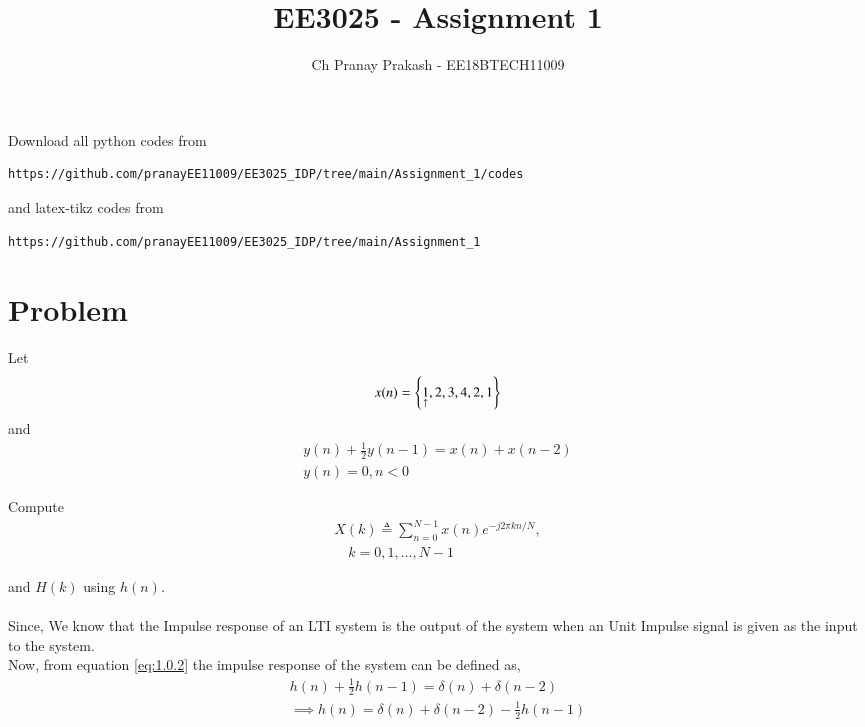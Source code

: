 \documentclass[journal,12pt,twocolumn]{IEEEtran}
\begin{document}
     \def\rightbox#1{\makebox[0in][r]{#1}}
     \def\centbox#1{\makebox[0in]{#1}}
     \def\topbox#1{\raisebox{-\baselineskip}[0in][0in]{#1}}
     \def\midbox#1{\raisebox{-0.5\baselineskip}[0in][0in]{#1}}
\vspace{3cm}
\title{EE3025 - Assignment 1}
\author{Ch Pranay Prakash - EE18BTECH11009}
\maketitle
\newpage
\bigskip
\renewcommand{\thefigure}{\theenumi}
\renewcommand{\thetable}{\theenumi}
Download all python codes from 
\begin{lstlisting}
https://github.com/pranayEE11009/EE3025_IDP/tree/main/Assignment_1/codes
\end{lstlisting}
%
and latex-tikz codes from 
%
\begin{lstlisting}
https://github.com/pranayEE11009/EE3025_IDP/tree/main/Assignment_1
\end{lstlisting}
\section{Problem}
Let
\begin{align}
    x(n) = \left\{\underset{\uparrow}{1},2,3,4,2,1\right\} 
\end{align}
and 
\begin{multline}
    y(n) + \frac{1}{2}y(n-1) = x(n) + x(n-2) \label{eq:1.0.2}
    \\
    y(n) = 0 , n<0
\end{multline}

Compute
\begin{multline}
    X(k) \triangleq \sum_{n=0}^{N-1}x(n)e^{-j2\pi kn/N},
    \\
    \quad k=0,1, \ldots, N-1
\end{multline}

and $H(k)$ using $h(n)$.\\

\solution \\

Since, We know that the Impulse response of an LTI system is the output of the system
when an Unit Impulse signal is given as the input to the system.\\

 

Now, from  equation \eqref{eq:1.0.2} the impulse response of the system can be defined as,
\begin{align}
    h(n) + \frac{1}{2}h(n-1) = \delta(n) + \delta(n-2)	
    \\
    \implies h(n) = \delta(n) + \delta(n-2) - \frac{1}{2}h(n-1)
\end{align}
\end{document}
